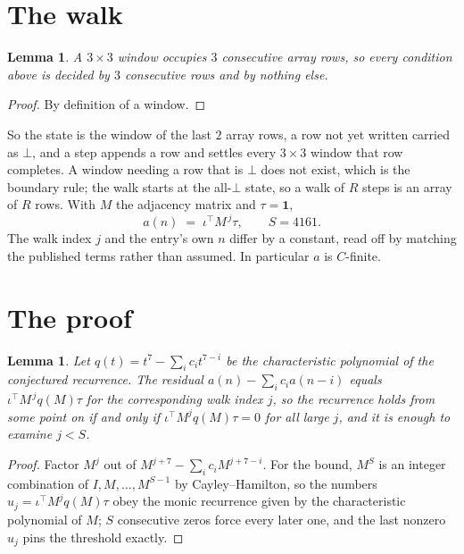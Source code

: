 \documentclass[11pt,a4paper]{article}
\theoremstyle{plain}
\newtheorem{lemma}[theorem]{Lemma}
\theoremstyle{definition}
\begin{document}
\section{The walk}

\begin{lemma}\label{lem:win}
A $3\times3$ window occupies $3$ consecutive array rows, so every condition above is
decided by $3$ consecutive rows and by nothing else.
\end{lemma}

\begin{proof}
By definition of a window.
\end{proof}

So the state is the window of the last $2$ array rows, a row not yet written carried as
$\bot$, and a step appends a row and settles every $3\times3$ window that row completes. A
window needing a row that is $\bot$ does not exist, which is the boundary rule; the walk starts
at the all-$\bot$ state, so a walk of $R$ steps is an array of $R$ rows. With $M$ the adjacency
matrix and $\tau=\mathbf{1}$,
\[
a(n)\;=\;\iota^{\!\top}M^{\,j}\tau ,\qquad S=4161.
\]
The walk index $j$ and the entry's own $n$ differ by a constant, read off by matching the
published terms rather than assumed. In particular $a$ is $C$-finite.

\section{The proof}

\begin{lemma}\label{lem:crit}
Let $q(t)=t^{7}-\sum_i c_it^{7-i}$ be the characteristic polynomial of the
conjectured recurrence. The residual $a(n)-\sum_ic_ia(n-i)$ equals
$\iota^{\!\top}M^{\,j}q(M)\tau$ for the corresponding walk index $j$, so the recurrence
holds from some point on if and only if $\iota^{\!\top}M^{j}q(M)\tau=0$ for all large $j$,
and it is enough to examine $j<S$.
\end{lemma}

\begin{proof}
Factor $M^{j}$ out of $M^{j+7}-\sum_ic_iM^{j+7-i}$. For the bound, $M^{S}$
is an integer combination of $I,M,\dots,M^{S-1}$ by Cayley--Hamilton, so the numbers
$u_j=\iota^{\!\top}M^{j}q(M)\tau$ obey the monic recurrence given by the characteristic
polynomial of $M$; $S$ consecutive zeros force every later one, and the last nonzero $u_j$
pins the threshold exactly.
\end{proof}
\end{document}
